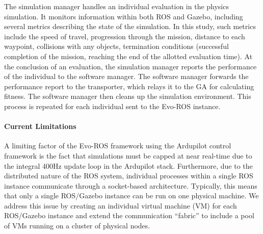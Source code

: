The simulation manager handles an individual evaluation in the physics simulation.  
%
It monitors information within both ROS and Gazebo, including several
metrics describing the state of the simulation.
In this study, such metrics include the speed of travel, 
progression through the mission, distance to each waypoint, collisions with any objects, 
termination conditions (successful completion of the mission, 
reaching the end of the allotted evaluation time).
%
At the conclusion of an evaluation, the simulation manager reports 
the performance of the individual to the software manager. 
%
The software manager forwards the performance report to the transporter, 
which relays it to the GA for calculating fitness.
The software manager then cleans up the simulation environment.
This process is repeated for each individual sent to the Evo-ROS instance.

\paragraph{Current Limitations}
A limiting factor of the Evo-ROS framework using the Ardupilot control framework is the fact that simulations must be capped at near real-time due to the integral 400Hz update loop in the Ardupilot stack.  
%
Furthermore, due to the distributed nature of the ROS system, individual processes within a single ROS instance communicate through a socket-based architecture.  
%
Typically, this means that only a single ROS/Gazebo instance can be run on one physical machine.  
%
We address this issue by creating an individual virtual machine (VM) for each ROS/Gazebo instance and
extend the communication ``fabric'' to include a pool of VMs running on a cluster of
physical nodes.
%

